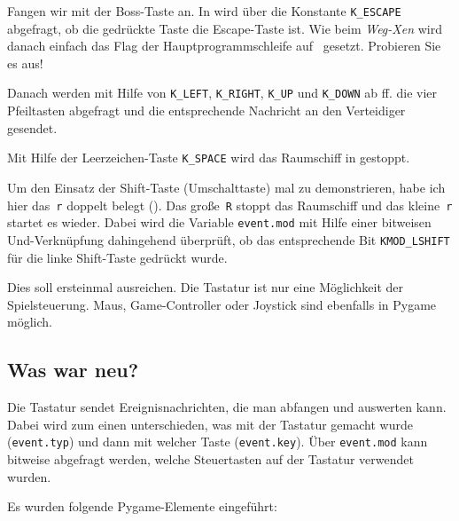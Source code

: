 
Fangen wir mit der Boss-Taste an. In  wird über die Konstante \texttt{K\_ESCAPE} abgefragt, ob die gedrückte Taste die Escape-Taste ist. Wie beim \emph{Weg-Xen} wird danach einfach das Flag der Hauptprogrammschleife auf \false\ gesetzt. Probieren Sie es aus!

Danach werden mit Hilfe von \texttt{K\_LEFT}, \texttt{K\_RIGHT}, \texttt{K\_UP} und \texttt{K\_DOWN} ab ff. die vier Pfeiltasten abgefragt und die entsprechende Nachricht an den Verteidiger gesendet.

Mit Hilfe der Leerzeichen-Taste \texttt{K\_SPACE} wird das Raumschiff in  gestoppt. 

Um den Einsatz der Shift-Taste (Umschalttaste) mal zu demonstrieren, habe ich hier das~\texttt{r} doppelt belegt (). Das große~\texttt{R} stoppt das Raumschiff und das kleine~\texttt{r} startet es wieder. Dabei wird die Variable \texttt{event.mod} mit Hilfe einer bitweisen Und-Verknüpfung dahingehend überprüft, ob das entsprechende Bit \texttt{KMOD\_LSHIFT} für die linke Shift-Taste gedrückt wurde.

Dies soll ersteinmal ausreichen. Die Tastatur ist nur eine Möglichkeit der Spielsteuerung. Maus, Game-Controller oder Joystick sind ebenfalls in Pygame möglich.

\subsection*{Was war neu?}
Die Tastatur sendet Ereignisnachrichten, die man abfangen und auswerten kann. Dabei wird zum einen unterschieden, was mit der Tastatur gemacht wurde (\texttt{event.typ}) und dann mit welcher Taste (\texttt{event.key}). Über \texttt{event.mod} kann bitweise abgefragt werden, welche Steuertasten auf der Tastatur verwendet wurden.

Es wurden folgende Pygame-Elemente eingeführt:


